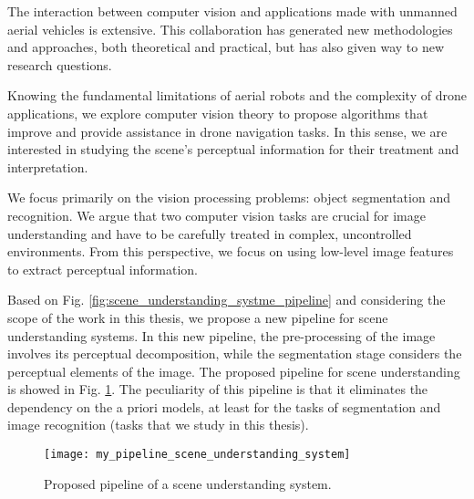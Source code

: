 The interaction between computer vision and applications made with unmanned aerial vehicles is extensive. This collaboration has generated new methodologies and approaches, both theoretical and practical, but has also given way to new research questions. 


Knowing the fundamental limitations of aerial robots and the complexity of drone applications, we explore computer vision theory to propose algorithms that improve and provide assistance in drone navigation tasks. In this sense, we are interested in studying the scene's perceptual information for their treatment and interpretation.

We focus primarily on the vision processing problems: object segmentation and recognition. We argue that two computer vision tasks are crucial for image understanding and have to be carefully treated in complex, uncontrolled environments. From this perspective, we focus on using low-level image features to extract perceptual information. 

Based on Fig. \ref{fig:scene_understanding_systme_pipeline} and considering the scope of the work in this thesis, we propose a new pipeline for scene understanding systems. In this new pipeline, the pre-processing of the image involves its perceptual decomposition, while the segmentation stage considers the perceptual elements of the image. The proposed pipeline for scene understanding is showed in Fig. \ref{fig:my_scene_understanding_systme_pipeline}. The peculiarity of this pipeline is that it eliminates the dependency on the a priori models, at least for the tasks of segmentation and image recognition (tasks that we study in this thesis). 

\begin{figure}[!ht]
    \centering
    \texttt{[image: my\_pipeline\_scene\_understanding\_system]}        
    \caption{Proposed pipeline of a scene understanding system.}\label{fig:my_scene_understanding_systme_pipeline}
\end{figure}

